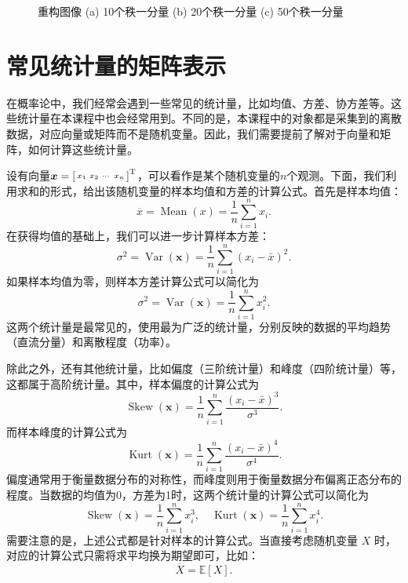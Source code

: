 \begin{solution}
\begin{figure}[htb!]
\begin{subfigure}{.3\textwidth}
            \caption{}
            \label{fig_tensor_cp_result_3}
        \end{subfigure}
        \caption{重构图像 (a) 10个秩一分量 (b) 20个秩一分量 (c) 50个秩一分量}
        \label{fig_tensor_cp_result}
    \end{figure}

\end{solution}

\section{常见统计量的矩阵表示}

在概率论中，我们经常会遇到一些常见的统计量，比如均值、方差、协方差等。这些统计量在本课程中也会经常用到。不同的是，本课程中的对象都是采集到的离散数据，对应向量或矩阵而不是随机变量。因此，我们需要提前了解对于向量和矩阵，如何计算这些统计量。

设有向量\( \boldsymbol{x} = \begin{bsmallmatrix} x_1 & x_2 & \cdots & x_n \end{bsmallmatrix}^{\mathrm{T}} \)，可以看作是某个随机变量的\( n \)个观测。下面，我们利用求和的形式，给出该随机变量的样本均值和方差的计算公式。首先是样本均值：
\[
    \overline{x} = \operatorname{Mean}(x) = \frac{1}{n} \sum_{i=1}^n x_i.
\]
在获得均值的基础上，我们可以进一步计算样本方差：
\[
    \sigma^2 = \operatorname{Var}(\bm{x}) = \frac{1}{n} \sum_{i=1}^n (x_i - \bar{x})^2.
\]
如果样本均值为零，则样本方差计算公式可以简化为
\[
    \sigma^2 = \operatorname{Var}(\bm{x}) =  \frac{1}{n} \sum_{i=1}^n x_i^2.
\]
这两个统计量是最常见的，使用最为广泛的统计量，分别反映的数据的平均趋势（直流分量）和离散程度（功率）。

除此之外，还有其他统计量，比如偏度（三阶统计量）和峰度（四阶统计量）等，这都属于高阶统计量。其中，样本偏度的计算公式为
\[
    \operatorname{Skew}(\bm{x}) = \frac{1}{n} \sum_{i=1}^n \frac{(x_i - \bar{x})^3}{\sigma^3}.
\]
而样本峰度的计算公式为
\[
    \operatorname{Kurt}(\bm{x}) = \frac{1}{n} \sum_{i=1}^n \frac{(x_i - \bar{x})^4}{\sigma^4}.
\]
偏度通常用于衡量数据分布的对称性，而峰度则用于衡量数据分布偏离正态分布的程度。当数据的均值为0，方差为1时，这两个统计量的计算公式可以简化为
\[
    \operatorname{Skew}(\bm{x}) = \frac{1}{n} \sum_{i=1}^n x_i^3, \quad \operatorname{Kurt}(\bm{x}) = \frac{1}{n} \sum_{i=1}^n x_i^4.
\]
需要注意的是，上述公式都是针对样本的计算公式。当直接考虑随机变量 \( X \) 时，对应的计算公式只需将求平均换为期望即可，比如：
\[
    \overline{X} = \mathbb{E}[X].
\]

